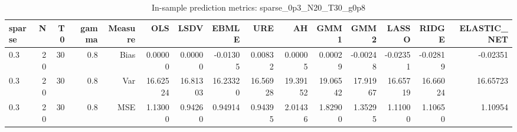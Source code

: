 \begin{table}[!htbp]\centering
\caption{In-sample prediction metrics: sparse_0p3_N20_T30_g0p8}
\label{tab:table2_sparse_0p3_N20_T30_g0p8}
\begin{tabular}{lrrrrrrrrrrrrrr}
\hline
sparse & N & T0 & gamma & Measure & OLS & LSDV & EBMLE & URE & AH & GMM1 & GMM2 & LASSO & RIDGE & ELASTIC_NET \\
\hline
0.3 & 20 & 30 & 0.8 & Bias & 0.00000 & 0.00000 & -0.01305 & 0.00832 & 0.00005 & 0.00029 & -0.00248 & -0.02351 & -0.02819 & -0.02351 \\
0.3 & 20 & 30 & 0.8 & Var & 16.62524 & 16.81303 & 16.23320 & 16.56928 & 19.39152 & 19.06542 & 17.91967 & 16.65719 & 16.66024 & 16.65723 \\
0.3 & 20 & 30 & 0.8 & MSE & 1.13000 & 0.94260 & 0.94914 & 0.94395 & 2.01436 & 1.82900 & 1.35295 & 1.11000 & 1.10650 & 1.10954 \\
\hline
\end{tabular}
\end{table}

